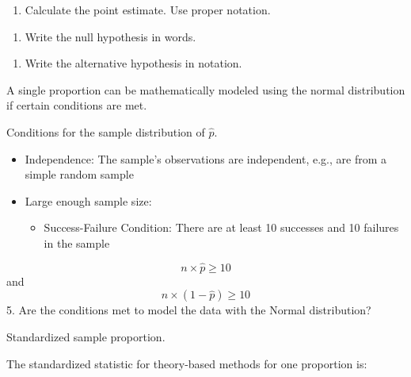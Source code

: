 \documentclass[
]{report}
\providecommand{\tightlist}{%
  \setlength{\itemsep}{0pt}\setlength{\parskip}{0pt}}
\begin{document}
\begin{enumerate}
\def\labelenumi{\arabic{enumi}.}
\setcounter{enumi}{1}
\tightlist
\item
  Calculate the point estimate. Use proper notation.
\end{enumerate}

\vspace{0.3in}

\begin{enumerate}
\def\labelenumi{\arabic{enumi}.}
\setcounter{enumi}{2}
\tightlist
\item
  Write the null hypothesis in words.
\end{enumerate}

\vspace{0.6in}

\begin{enumerate}
\def\labelenumi{\arabic{enumi}.}
\setcounter{enumi}{3}
\tightlist
\item
  Write the alternative hypothesis in notation.
\end{enumerate}

\vspace{0.2in}

A single proportion can be mathematically modeled using the normal distribution if certain conditions are met.

Conditions for the sample distribution of \(\hat{p}\).

\begin{itemize}
\item
  Independence: The sample's observations are independent, e.g., are from a simple random sample
\item
  Large enough sample size:

  \begin{itemize}
  \tightlist
  \item
    Success-Failure Condition: There are at least 10 successes and 10 failures in the sample
  \end{itemize}
\end{itemize}

\[n \times \hat{p} \ge 10\] and \[n \times (1-\hat{p}) \ge 10\]
5. Are the conditions met to model the data with the Normal distribution?

\vspace{0.6in}

Standardized sample proportion.

The standardized statistic for theory-based methods for one proportion is:
\end{document}
